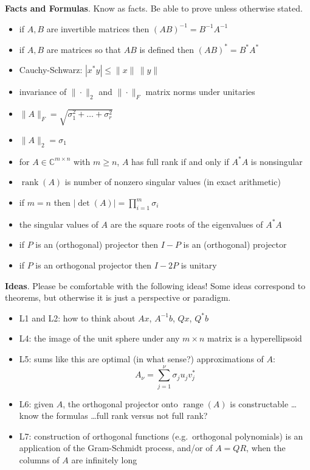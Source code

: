 \documentclass[11pt]{amsart}
\newcommand{\normalspacing}{\renewcommand{\baselinestretch}{1.1}\tiny\normalsize}
\newcommand{\bigspacing}{\renewcommand{\baselinestretch}{1.21}\tiny\normalsize}
\newcommand{\CC}{{\mathbb{C}}}
\newcommand{\rank}{\operatorname{rank}}
\newcommand{\range}{\operatorname{range}}
\begin{document}
\newpage\noindent \textbf{Facts and Formulas}.  Know as facts.  Be able to prove unless otherwise stated.
\begin{itemize}
\item if $A,B$ are invertible matrices then $(AB)^{-1} = B^{-1} A^{-1}$
\item if $A,B$ are matrices so that $AB$ is defined then $(AB)^* = B^* A^*$
\item Cauchy-Schwarz: $|x^* y| \le \|x\|\,\|y\|$ 
\item invariance of $\|\cdot\|_2$ and $\|\cdot\|_F$ matrix norms under unitaries
\item $\|A\|_F = \sqrt{\sigma_1^2 + \dots + \sigma_r^2}$
\item $\|A\|_2 = \sigma_1$
\item for $A\in \CC^{m\times n}$ with $m\ge n$, $A$ has full rank if and only if $A^* A$ is nonsingular
\item $\rank(A)$ is number of nonzero singular values (in exact arithmetic)
\item if $m=n$ then $|\det(A)|=\prod_{i=1}^m \sigma_i$
\item the singular values of $A$ are the square roots of the eigenvalues of $A^*A$
\item if $P$ is an (orthogonal) projector then $I-P$ is an (orthogonal) projector
\item if $P$ is an orthogonal projector then $I-2P$ is unitary
\end{itemize}

\normalspacing

\bigskip\noindent \textbf{Ideas}.  Please be comfortable with the following ideas!  Some ideas correspond to theorems, but otherwise it is just a perspective or paradigm.

\bigspacing
\begin{itemize}
\item L1 and L2: how to think about $Ax$, $A^{-1}b$, $Qx$, $Q^* b$
\item L4: the image of the unit sphere under any $m\times n$ matrix is a hyperellipsoid
\item L5: sums like this are optimal (in what sense?) approximations of $A$:
	$$A_\nu = \sum_{j=1}^\nu \sigma_j u_j v_j^*$$
\item L6: given $A$, the orthogonal projector onto $\range(A)$ is constructable \dots know the formulas \dots full rank versus not full rank?
\item L7: construction of orthogonal functions (e.g.~orthogonal polynomials) is an application of the Gram-Schmidt process, and/or of $A=QR$, when the columns of $A$ are infinitely long
\end{itemize}
\end{document}
